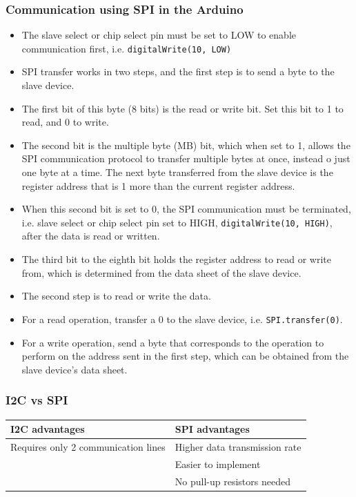 \documentclass[11pt]{article}
\begin{document}
\subsubsection{Communication using SPI in the Arduino}
\label{sec:org31fe9c5}
\begin{itemize}
\item The slave select or chip select pin must be set to LOW to enable communication first, i.e. \texttt{digitalWrite(10, LOW)}
\item SPI transfer works in two steps, and the first step is to send a byte to the slave device.
\item The first bit of this byte (8 bits) is the read or write bit. Set this bit to 1 to read, and 0 to write.
\item The second bit is the multiple byte (MB) bit, which when set to 1, allows the SPI communication protocol to transfer multiple bytes at once, instead o just one byte at a time. The next byte transferred from the slave device is the register address that is 1 more than the current register address.
\item When this second bit is set to 0, the SPI communication must be terminated, i.e. slave select or chip select pin set to HIGH, \texttt{digitalWrite(10, HIGH)}, after the data is read or written.
\item The third bit to the eighth bit holds the register address to read or write from, which is determined from the data sheet of the slave device.
\item The second step is to read or write the data.
\item For a read operation, transfer a 0 to the slave device, i.e. \texttt{SPI.transfer(0)}.
\item For a write operation, send a byte that corresponds to the operation to perform on the address sent in the first step, which can be obtained from the slave device's data sheet.
\end{itemize}

\subsubsection{I2C vs SPI}
\label{sec:orgcd11fa4}
\begin{center}
\begin{tabular}{l|l}
I2C advantages & SPI advantages\\[0pt]
\hline
Requires only 2 communication lines & Higher data transmission rate\\[0pt]
 & Easier to implement\\[0pt]
 & No pull-up resistors needed\\[0pt]
\end{tabular}
\end{center}
\end{document}

